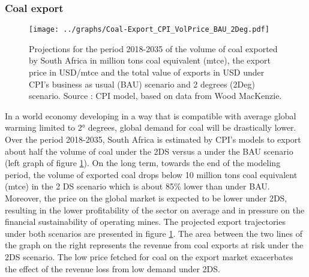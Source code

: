 \documentclass[12pt,english]{article}
\begin{document}
\subsubsection{Coal export}


\begin{figure}[!h]
	\centering
	\texttt{[image: ../graphs/Coal-Export\_CPI\_VolPrice\_BAU\_2Deg.pdf]}
	\caption{\label{Coal-Export_CPI_VolPrice_BAU_2Deg}\small Projections for the period 2018-2035 of the volume of coal exported by South Africa in million tons coal equivalent (mtce), the export price in USD/mtce and the total value of exports in USD under CPI's business as usual (BAU) scenario and 2 degrees (2Deg) scenario. Source : CPI model, based on data from Wood MacKenzie.}
\end{figure}

In a world economy developing in a way that is compatible with average global warming limited to 2° degrees, global demand for coal will be drastically lower. Over the period 2018-2035, South Africa is estimated by CPI's models to export about half the volume of coal under the 2DS versus a under the BAU scenario (left graph of figure \ref{Coal-Export_CPI_VolPrice_BAU_2Deg}). %
On the long term, towards the end of the modeling period, the volume of exported coal drops below 10 million tons coal equivalent (mtce) in the 2 DS scenario which is about 85\% lower than under BAU. Moreover, the price on the global market is expected to be lower under 2DS, resulting in the lower profitability of the sector on average and in pressure %
on the financial sustainability of operating mines. %
The projected export trajectories under both scenarios are presented in figure \ref{Coal-Export_CPI_VolPrice_BAU_2Deg}. The area between the two lines of the graph on the right represents the revenue from coal exports at risk under the 2DS scenario. The low price fetched for coal on the export market exacerbates the effect of the revenue loss from low demand under 2DS. 
\end{document}
